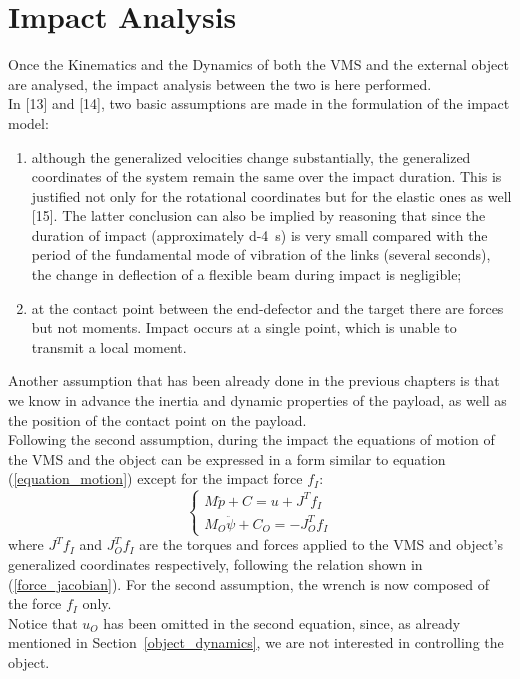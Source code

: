 \documentclass[a4paper,12pt,oneside]{report}
\begin{document}
\chapter{Impact Analysis}\label{impact_analysis}
Once the Kinematics and the Dynamics of both the VMS and the external object are analysed, the impact analysis between the two is here performed.\\
In [13] and [14], two basic assumptions are made in the formulation of the impact model:
\begin{enumerate}
  \item although the generalized velocities change substantially, the generalized coordinates of the system remain the same over the impact duration. This is justified not only for the rotational coordinates but for the elastic ones as well [15]. The latter conclusion can also be implied by reasoning that since the duration of impact (approximately \SI{d-4}{\second}) is very small compared with the period of the fundamental mode of vibration of the links (several seconds), the change in deflection of a flexible beam during impact is negligible;
  \item at the contact point between the end-defector and the target there are forces but not moments. Impact occurs at a single point, which is unable to transmit a local moment.
\end{enumerate}
Another assumption that has been already done in the previous chapters is that we know in advance the inertia and dynamic properties of the payload, as well as the position of the contact point on the payload.\\
Following the second assumption, during the impact the equations of motion of the VMS and the object can be expressed in a form similar to equation (\ref{equation_motion}) except for the impact force $f_I$:
\begin{equation}
  \begin{cases}
    M\ddot{p}+C=u+J^Tf_I\\
    M_O\ddot{\psi}+C_O=-J_O^Tf_I
  \end{cases}
  \label{initial_impact}
\end{equation}
where $J^Tf_I$ and $J_O^Tf_I$ are the torques and forces applied to the VMS and object's generalized coordinates respectively, following the relation shown in (\ref{force_jacobian}). For the second assumption, the wrench is now composed of the force $f_I$ only.\\
Notice that $u_O$ has been omitted in the second equation, since, as already mentioned in Section~\ref{object_dynamics}, we are not interested in controlling the object.\\
\end{document}
